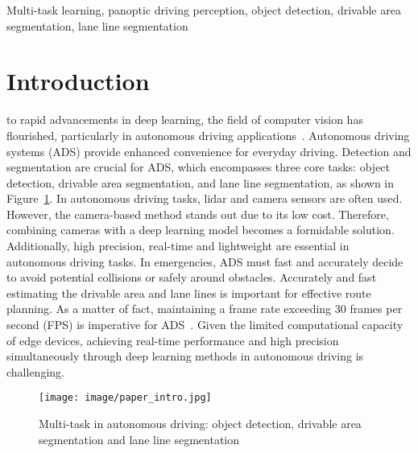 \documentclass[lettersize,journal]{IEEEtran}
\begin{document}
\begin{IEEEkeywords}
Multi-task learning, panoptic driving perception, object detection, drivable area segmentation, lane line segmentation
\end{IEEEkeywords}

\section{Introduction}
\label{sec:introduction}




 to rapid advancements in deep learning, the field of computer vision has flourished, particularly in autonomous driving applications~\cite{zhao2023drmnet,guo2023haze,fan2021fii}. Autonomous driving systems (ADS) provide enhanced convenience for everyday driving. Detection and segmentation are crucial for ADS, which encompasses three core tasks: object detection, drivable area segmentation, and lane line segmentation, as shown in Figure~\ref{fig:intro_fig}. In autonomous driving tasks, lidar and camera sensors are often used. However, the camera-based method stands out due to its low cost. Therefore, combining cameras with a deep learning model becomes a formidable solution. Additionally, high precision, real-time and lightweight are essential in autonomous driving tasks. In emergencies, ADS must fast and accurately decide to avoid potential collisions or safely around obstacles. Accurately and fast estimating the drivable area and lane lines is important for effective route planning. As a matter of fact, maintaining a frame rate exceeding 30 frames per second (FPS) is imperative for ADS~\cite{wang2023centernet}. Given the limited computational capacity of edge devices, achieving real-time performance and high precision simultaneously through deep learning methods in autonomous driving is challenging. 



\begin{figure}[t!]
    \centering
    \texttt{[image: image/paper\_intro.jpg]}
    \caption{Multi-task in autonomous driving: object detection, drivable area segmentation and lane line segmentation}
    \label{fig:intro_fig}
\end{figure}

\IEEEpubidadjcol
\end{document}
